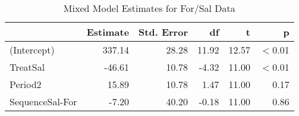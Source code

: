 \begin{table}

\caption{\label{tab:pefrDataEstimates}Mixed Model Estimates for For/Sal Data}
\centering
\begin{tabular}[t]{>{}l|rrrrr}
\toprule
 & Estimate & Std. Error & df & t & p\\
\midrule
(Intercept) & 337.14 & 28.28 & 11.92 & 12.57 & $<$0.01\\
TreatSal & -46.61 & 10.78 & -4.32 & 11.00 & $<$0.01\\
Period2 & 15.89 & 10.78 & 1.47 & 11.00 & 0.17\\
SequenceSal-For & -7.20 & 40.20 & -0.18 & 11.00 & 0.86\\
\bottomrule
\end{tabular}
\end{table}
